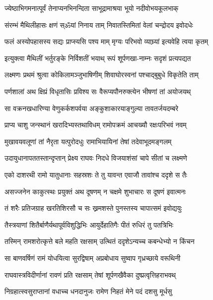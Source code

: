 \twolineshloka
{ज्येष्ठाभिगमनात्पूर्वं तेनाप्यनभिनन्दिता}
{साभूद्रामाश्रया भूयो नदीवोभयकूलभाक्}%

\twolineshloka
{संरम्भं मैथिलीहासः क्षणं स्ॐयां निनाय ताम्}
{निवातस्तिमितां वेलां चन्द्रोदय इवोदधेः}%

\twolineshloka
{फलं अस्योपहासस्य सद्यः प्राप्स्यसि पश्य माम्}
{मृग्यः परिभवो व्याघ्र्यां इत्यवेहि त्वया कृतम्}%

\twolineshloka
{इत्युक्त्वा मैथिलीं भर्तुरङ्के निर्विशतीं भयाथ्}
{रूपं शूर्पणखा-नाम्नः सदृशं प्रत्यपद्यत}%

\twolineshloka
{लक्ष्मणः प्रथमं श्रुत्वा कोकिलामञ्जुभाषिणीम्}
{शिवाघोरस्वनां पश्चाद्बुबुधे विकृतेति ताम्}%

\twolineshloka
{पर्णशालां अथ क्षिप्रं विधृतासिः प्रविश्य सः}
{वैरूप्यपौनरुक्त्येन भीषणां तां अयोजयथ्}%

\twolineshloka
{सा वक्रनखधारिण्या वेणुकर्कशपर्वया}
{अङ्कुशाकारयाङ्गुल्या तावतर्जयदम्बरे}%

\twolineshloka
{प्राप्य चाशु जन्स्थानं खरादिभ्यस्तथाविधम्}
{रामोपक्रमं आचख्यौ रक्षःपरिभवं नवम्}%

\twolineshloka
{मुखावयवलूणां तां नैरृता यत्पुरोदधुः}
{रामाभियायिनां तेषां तदेवाभूदमङ्गलम्}%

\twolineshloka
{उदायुधानापततस्तान्दृप्तान् प्रेक्ष्य राघवः}
{निदधे विजयाशंसां चापे सीतां च लक्ष्मणे}%

\twolineshloka
{एको दाशरथी रामो यातुधानाः सहस्रशः}
{ते तु यावन्त एवाजौ तावांश्च ददृशे स तैः}%

\twolineshloka
{असज्जनेन काकुत्स्थः प्रयुक्तं अथ दूषणम्}
{न चक्षमे शुभाचारः स दूषणं इवात्मनः}%

\twolineshloka
{तं शरैः प्रतिजग्राह खरतिशिरसौ च सः}
{ख्रमशस्ते पुनस्तस्य चापात्समं इवोद्ययुः}%

\twolineshloka
{तैस्त्रयाणां शितैर्बाणैर्यथापूर्वविशुद्धिभिः}
{आयुर्देहातिगैः पीतं रुधिरं तु पतत्रिभिः}%

\twolineshloka
{तस्मिन् रामशरोत्कृत्ते बले महति रक्षसाम्}
{उत्थितं ददृशेऽन्यच्च कबन्धेभ्यो न किंचन}%

\twolineshloka
{सा बाणवर्षिणं रामं योधयित्वा सुरद्विषाम्}
{अप्रबोधाय सुष्वाप गृध्रच्छाये वरूथिनी}%

\twolineshloka
{राघवास्त्रविदीर्णानां रावणं प्रति रक्षसाम्}
{तेषां शूर्पणखैवैका दुष्प्रत्वृत्तिहराभवथ्}%

\twolineshloka
{निग्रहात्स्वसुराप्तानां वधाच्च धनदानुजः}
{रामेण निहतं मेने पदं दशसु मूर्धसु}%

